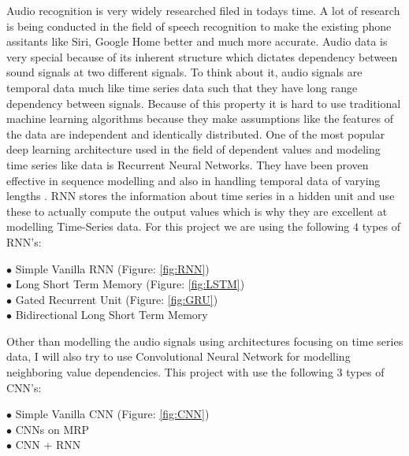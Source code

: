 \documentclass[letterpaper, 12 pt, conference]{ieeeconf}  %
\begin{document}
Audio recognition is very widely researched filed in todays time. A lot of research is being conducted in the field of speech recognition to make the existing phone assitants like Siri, Google Home better and much more accurate. Audio data is very special because of its inherent structure which dictates dependency between sound signals at two different signals. To think about it, audio signals are temporal data much like time series data such that they have long range dependency between signals. Because of this property it is hard to use traditional machine learning algorithms because they make assumptions like the features of the data are independent and identically distributed. One of the most popular deep learning architecture used in the field of dependent values and modeling time series like data is Recurrent Neural Networks. They have been proven effective in sequence modelling \cite{gru_evaluation} and also in handling temporal data of varying lengths \cite{gru_evaluation}. RNN stores the information about time series in a hidden unit and use these to actually compute the output values which is why they are excellent at modelling Time-Series data. For this project we are using the following $4$ types of RNN's:

\begin{description}
	\item [$\bullet$ Simple Vanilla RNN (Figure: \ref{fig:RNN})]
	\item [$\bullet$ Long Short Term Memory (Figure: \ref{fig:LSTM})]
	\item [$\bullet$ Gated Recurrent Unit (Figure: \ref{fig:GRU})]
	\item [$\bullet$ Bidirectional Long Short Term Memory]
\end{description}

Other than modelling the audio signals using architectures focusing on time series data, I will also try to use Convolutional Neural Network for modelling neighboring value dependencies. This project with use the following $3$ types of CNN's:
\begin{description}
	\item [$\bullet$ Simple Vanilla CNN (Figure: \ref{fig:CNN})]
	\item [$\bullet$ CNNs on MRP]
	\item [$\bullet$ CNN + RNN] 
\end{description}
\end{document}
